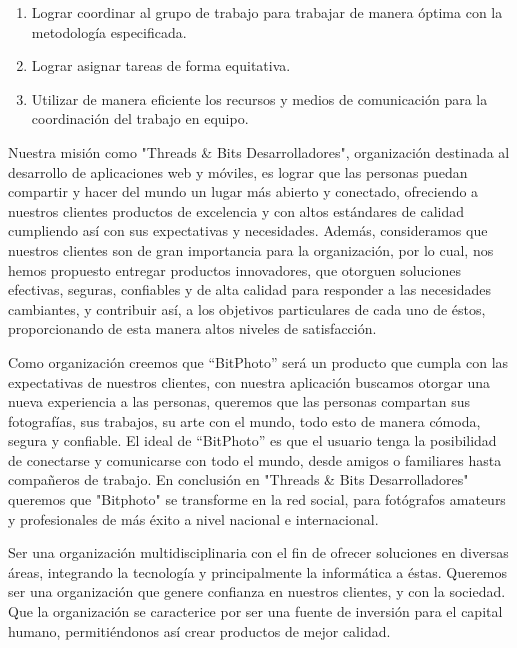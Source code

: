 \documentclass{memoria}
\begin{document}
\begin{enumerate}
	\item Lograr coordinar al grupo de trabajo para trabajar de manera óptima con la metodología especificada.
	\item Lograr asignar tareas de forma equitativa.
	\item Utilizar de manera eficiente los recursos y medios de comunicación para la coordinación del trabajo en equipo.
\end{enumerate}




Nuestra misión como "Threads \& Bits Desarrolladores", organización destinada al desarrollo de aplicaciones web y móviles, es  lograr que las personas puedan compartir y hacer del mundo un lugar más abierto y conectado, ofreciendo a nuestros clientes productos de excelencia y con altos estándares de calidad cumpliendo así con sus expectativas y necesidades. Además, consideramos que nuestros clientes son de gran importancia para la organización, por lo cual, nos hemos propuesto entregar productos innovadores, que otorguen soluciones efectivas, seguras, confiables y de alta calidad para responder a las necesidades cambiantes, y contribuir así, a los objetivos particulares de cada uno de éstos, proporcionando de esta manera altos niveles de satisfacción.

Como organización creemos que “BitPhoto” será un producto que cumpla con las expectativas de nuestros clientes, con nuestra aplicación buscamos otorgar una nueva experiencia a las personas, queremos que las personas compartan sus fotografías, sus trabajos, su arte con el mundo, todo esto de manera cómoda, segura y confiable. El ideal de “BitPhoto” es que el usuario tenga la posibilidad de conectarse y comunicarse con todo el mundo, desde amigos o familiares hasta compañeros de trabajo. En conclusión en "Threads \& Bits Desarrolladores" queremos que "Bitphoto" se transforme en la red social, para fotógrafos amateurs y profesionales de más éxito a nivel nacional e internacional.\\



Ser una organización multidisciplinaria con el fin de ofrecer soluciones en diversas áreas, integrando la tecnología y principalmente la informática a éstas. Queremos ser una organización que genere confianza en nuestros clientes, y con la sociedad. Que la organización se caracterice por ser una fuente de inversión para el capital humano, permitiéndonos así crear productos de mejor calidad.
\end{document}
